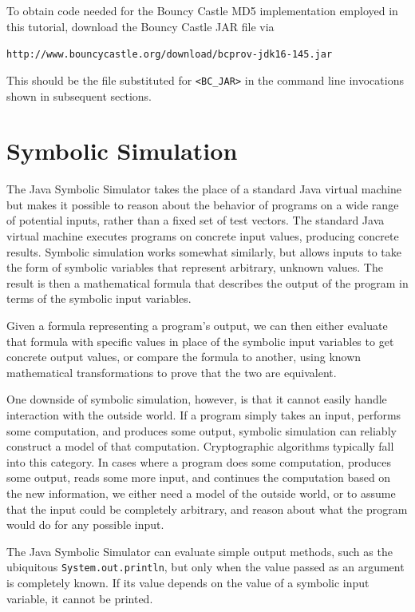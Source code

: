 \documentclass[11pt]{article}
\begin{document}
To obtain code needed for the Bouncy Castle MD5 implementation employed
in this tutorial, download the Bouncy Castle JAR file via

\begin{center}
\texttt{http://www.bouncycastle.org/download/bcprov-jdk16-145.jar}
\end{center}

This should be the file substituted for \texttt{<BC\_JAR>} in the command
line invocations shown in subsequent sections.

\section{Symbolic Simulation}

The Java Symbolic Simulator takes the place of a standard Java virtual
machine but makes it possible to reason about the behavior of programs
on a wide range of potential inputs, rather than a fixed set of test
vectors. The standard Java virtual machine executes programs on
concrete input values, producing concrete results. Symbolic simulation
works somewhat similarly, but allows inputs to take the form of
symbolic variables that represent arbitrary, unknown values. The
result is then a mathematical formula that describes the output of the
program in terms of the symbolic input variables.

Given a formula representing a program's output, we can then either
evaluate that formula with specific values in place of the symbolic
input variables to get concrete output values, or compare the formula
to another, using known mathematical transformations to prove that
the two are equivalent.

One downside of symbolic simulation, however, is that it cannot easily
handle interaction with the outside world. If a program simply takes an
input, performs some computation, and produces some output, symbolic
simulation can reliably construct a model of that computation.
Cryptographic algorithms typically fall into this category. In cases
where a program does some computation, produces some output, reads some
more input, and continues the computation based on the new information,
we either need a model of the outside world, or to assume that the input
could be completely arbitrary, and reason about what the program would
do for any possible input.

The Java Symbolic Simulator can evaluate simple output methods, such
as the ubiquitous \texttt{System.out.println}, but only when the value
passed as an argument is completely known. If its value depends on the
value of a symbolic input variable, it cannot be printed.
\end{document}
